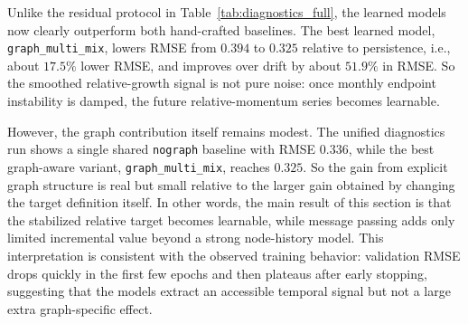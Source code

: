\documentclass{article}
\begin{document}
\begin{table}[htbp]
\centering
\caption{Evaluation on the full heatmap under \texttt{TARGET\_MODE=smooth\_relative\_level}. The predicted signal is the future value of the trailing-12 / lag-12 relative-growth series. Results come from the unified diagnostics run on all 532 active keywords, with \texttt{TEMP\_WINDOW=12} and \texttt{FORECAST=24}.}
\label{tab:smooth_relative_comparison}
\end{table}

Unlike the residual protocol in Table~\ref{tab:diagnostics_full}, the learned models now clearly outperform both hand-crafted baselines. The best learned model, \texttt{graph\_multi\_mix}, lowers RMSE from \(0.394\) to \(0.325\) relative to persistence, i.e., about \(17.5\%\) lower RMSE, and improves over drift by about \(51.9\%\) in RMSE. So the smoothed relative-growth signal is not pure noise: once monthly endpoint instability is damped, the future relative-momentum series becomes learnable.

However, the graph contribution itself remains modest. The unified diagnostics run shows a single shared \texttt{nograph} baseline with RMSE \(0.336\), while the best graph-aware variant, \texttt{graph\_multi\_mix}, reaches \(0.325\). So the gain from explicit graph structure is real but small relative to the larger gain obtained by changing the target definition itself. In other words, the main result of this section is that the stabilized relative target becomes learnable, while message passing adds only limited incremental value beyond a strong node-history model. This interpretation is consistent with the observed training behavior: validation RMSE drops quickly in the first few epochs and then plateaus after early stopping, suggesting that the models extract an accessible temporal signal but not a large extra graph-specific effect.
\end{document}
